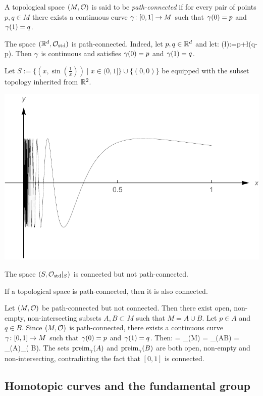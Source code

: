 \bd
A topological space $(M,\mathcal{O})$ is said to be \emph{path-connected} if for every pair of points $p,q\in M$ there exists a continuous curve $\gamma\colon[0,1]\to M$ such that $\gamma(0)=p$ and $\gamma(1)=q$.
\ed

\be
The space $(\mathbb{R}^d,\mathcal{O}_\mathrm{std})$ is path-connected. Indeed, let $p,q\in\mathbb{R}^d$ and let:
\bse
\g(\l):=p+\l(q-p).
\ese
Then $\gamma$ is continuous and satisfies $\gamma(0)=p$ and $\gamma(1)=q$.
\ee

\be
Let $S:=\{(x,\sin(\tfrac{1}{x}))\mid x\in (0,1]\}\cup \{(0,0)\}$ be equipped with the subset topology inherited from $\mathbb{R}^2$.
\begin{center}
\includegraphics[scale=0.7]{graphics/sinoneoverx}
\end{center}
The space $(S,\mathcal{O}_\mathrm{std}|_S)$ is connected but not path-connected.
\ee

\bt
If a topological space is path-connected, then it is also connected.
\et

\bq
Let $(M,\mathcal{O})$ be path-connected but not connected. Then there exist open, non-empty, non-intersecting subsets $A,B\subset M$ such that $M=A\cup B$. Let $p \in A$ and $q \in B$. Since $(M,\mathcal{O})$ is path-connected, there exists a continuous curve $\gamma\colon[0,1]\to M$ such that $\gamma(0)=p$ and $\gamma(1)=q$. Then:
\bse
[0,1] = _\g(M) =  _\g(A\cup B) =  _\g(A)\cup  {}_\g( B).
\ese
The sets $\mathrm{preim}_\gamma(A)$ and $ \mathrm{preim}_\gamma( B)$ are both open, non-empty and non-intersecting, contradicting the fact that $[0,1]$ is connected.
\eq

\subsection{Homotopic curves and the fundamental group}


